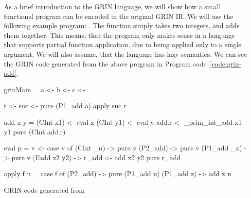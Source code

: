 \documentclass[main.tex]{subfiles}
\begin{document}
	As a brief introduction to the GRIN language, we will show how a small functional program can be encoded in the original GRIN IR. We will use the following example program: . The  function simply takes two integers, and adds them together. This means, that the program only makes sense in a language that supports partial function application, due to  being applied only to a single argument. We will also assume, that the language has lazy semantics. We can see the GRIN code generated from the above program in Program code~\ref{code:grin-add}.
	
	\hspace{-0.5cm}
	\begin{codeFloat}
		\begin{minipage}{0.48\textwidth}
			\begin{haskell}
	      grinMain =
	        a <- %
	        b <- %
	        c <- %
	        
	        r <- %
	        suc <- pure (P1_add a)
	        apply suc r
	
	      add x y =
	        (CInt x1) <- eval x
	        (CInt y1) <- eval y
	        add.r <- _prim_int_add x1 y1
	        pure (CInt add.r)
			\end{haskell}
		\end{minipage}
		\hfill
		\begin{minipage}{0.50\textwidth}
			\begin{haskellNum}{15}
	     eval p =
	       v <- %
	       case v of
	         (CInt _n)   -> pure v
	         (P2_add)    -> pure v
	         (P1_add _x) -> pure v
	         (Fadd x2 y2) ->
	           r_add <- add x2 y2
	           pure r_add
	       
	     apply f u =
	       case f of
	         (P2_add) -> 
	           pure (P1_add u)
	         (P1_add z) -> add z u
			\end{haskellNum}
		\end{minipage}
		\caption{GRIN code generated from }
		\label{code:grin-add}
		
	\end{codeFloat}
		
\end{document}
